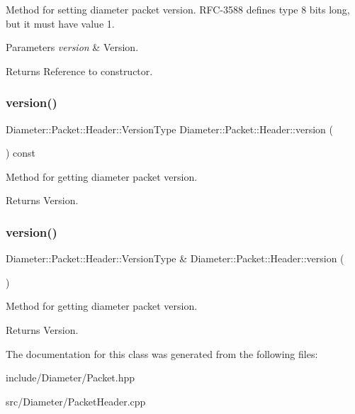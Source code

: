 Method for setting diameter packet version. R\+F\+C-\/3588 defines type 8 bits long, but it must have value 1. 


\begin{DoxyParams}{Parameters}
{\em version} & Version. \\
\hline
\end{DoxyParams}
\begin{DoxyReturn}{Returns}
Reference to constructor. 
\end{DoxyReturn}
\mbox{\label{classDiameter_1_1Packet_1_1Header_a8b2344000890055a9ef037888d0442c3}} 
\subsubsection{\texorpdfstring{version()}{version()}\hspace{0.1cm}{\footnotesize\ttfamily [1/2]}}
{\footnotesize\ttfamily Diameter\+::\+Packet\+::\+Header\+::\+Version\+Type Diameter\+::\+Packet\+::\+Header\+::version (\begin{DoxyParamCaption}{ }\end{DoxyParamCaption}) const}



Method for getting diameter packet version. 

\begin{DoxyReturn}{Returns}
Version. 
\end{DoxyReturn}
\mbox{\label{classDiameter_1_1Packet_1_1Header_aa1cb9b6dfa3b802fe3f0df1bfc938c1d}} 
\subsubsection{\texorpdfstring{version()}{version()}\hspace{0.1cm}{\footnotesize\ttfamily [2/2]}}
{\footnotesize\ttfamily Diameter\+::\+Packet\+::\+Header\+::\+Version\+Type \& Diameter\+::\+Packet\+::\+Header\+::version (\begin{DoxyParamCaption}{ }\end{DoxyParamCaption})}



Method for getting diameter packet version. 

\begin{DoxyReturn}{Returns}
Version. 
\end{DoxyReturn}


The documentation for this class was generated from the following files\+:\begin{DoxyCompactItemize}
\item 
include/\+Diameter/Packet.\+hpp\item 
src/\+Diameter/Packet\+Header.\+cpp\end{DoxyCompactItemize}
